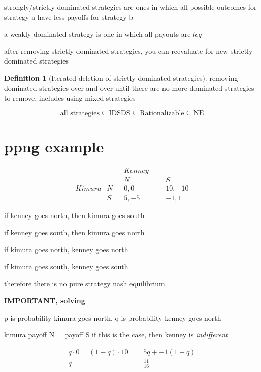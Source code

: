\documentclass{article}
\theoremstyle{definition}
\newtheorem{definition}{Definition}
\begin{document}
strongly/strictly dominated strategies are ones in which all possible outcomes for strategy a have less payoffs for strategy b 


a weakly dominated strategy is one in which all payouts are \(leq\) 


after removing strictly dominated strategies, you can reevaluate for new strictly dominated strategies


\begin{definition}[Iterated deletion of strictly dominated strategies]
    removing dominated strategies over and over until there are no more dominated strategies to remove. includes using mixed strategies
\end{definition}

\begin{equation}
    \text{all strategies} \subseteq \text{IDSDS} \subseteq \text{Rationalizable} \subseteq \text{NE}
\end{equation}

\section {ppng example}

\begin{equation}
    \begin{matrix}
        ~&~&&Kenney\\
        ~&~&&N&&&S\\
        Kimura&N&&0,0&&&10,-10\\
        ~&S&&5,-5&&&-1,1
    \end{matrix}
\end{equation}

if kenney goes north, then kimura goes south

if kenney goes south, then kimura goes north

if kimura goes north, kenney goes north

if kimura goes south, kenney goes south


therefore there is no pure strategy nash equilibrium

\textbf{IMPORTANT, solving}

p is probability kimura goes north, q is probability kenney goes north

kimura payoff N = payoff S 
if this is the case, then kenney is \emph{indifferent}

\begin{equation}\begin{split}
    q\cdot 0 = (1-q)\cdot 10 &= 5q + -1(1-q)\\
    q&=\frac{11}{16}
\end{split}
\end{equation}
\end{document}
